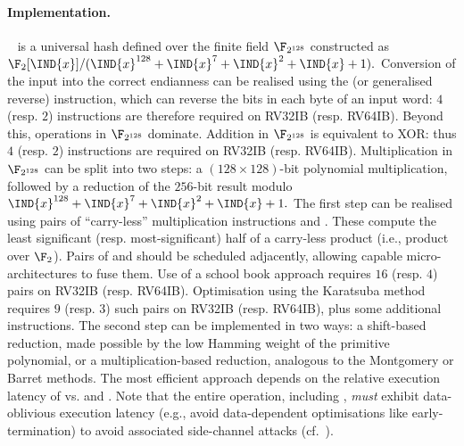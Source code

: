 
\paragraph{Implementation.}

~\cite[Section 6.4]{NIST:sp.800.38d} is a universal hash defined 
over the finite field $\F_{2^{128}}$ constructed as
$
\F_{2}[\IND{x}] / ( \IND{x}^{128} + \IND{x}^{7} + \IND{x}^{2} + \IND{x} + 1 ) .
$
Conversion of the input into the correct endianness can be realised using
the 
 (or generalised reverse)
instruction,
which can reverse the bits in each byte of an input word:
$4$ (resp. $2$) 
instructions are therefore required on RV32IB (resp. RV64IB).
Beyond this, operations in $\F_{2^{128}}$ dominate.
Addition       in $\F_{2^{128}}$ 
is equivalent to XOR: thus
$4$ (resp. $2$) 
instructions are required on RV32IB (resp. RV64IB).
Multiplication in $\F_{2^{128}}$ 
can be split into two steps:
a $( 128 \times 128 )$-bit polynomial multiplication, 
followed by 
a reduction of the $256$-bit result modulo
$
\IND{x}^{128} + \IND{x}^{7} + \IND{x}^{2} + \IND{x} + 1 .
$
The first  step 
can be realised using pairs of ``carry-less'' multiplication instructions
 and .
These compute the least significant (resp. most-significant) 
half of a carry-less product (i.e., product over $\F_2$).
Pairs of 
 and 
should be scheduled adjacently, allowing capable micro-architectures
to fuse them.
Use of a school book approach 
requires
$16$ (resp. $4$) pairs 
on RV32IB (resp. RV64IB).
Optimisation using the Karatsuba method
requires
$ 9$ (resp. $3$) such pairs 
on RV32IB (resp. RV64IB),
plus some additional  instructions.
The second step
can be implemented in two ways:
a shift-based reduction, made possible by the low Hamming weight of the
primitive polynomial,
or
a multiplication-based reduction, analogous to the Montgomery or Barret
methods.
The most efficient approach depends on the relative execution 
latency of
vs.
 and .
Note that the entire  operation, including ,
{\em must} exhibit data-oblivious execution latency 
(e.g., avoid data-dependent optimisations like early-termination)
to avoid associated side-channel attacks (cf.~\cite{GOPT:09}).


